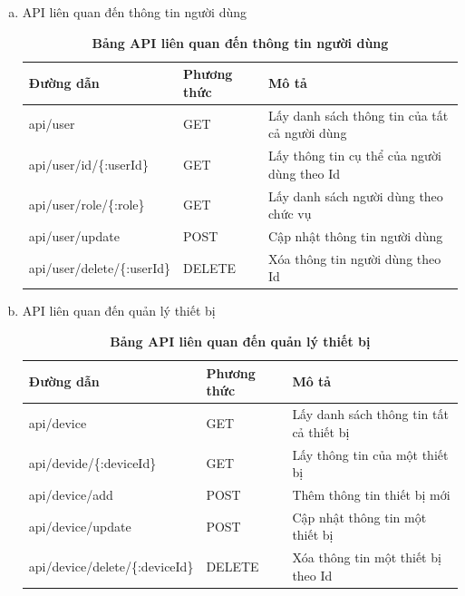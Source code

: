 \begin{enumerate}[a)]
\begin{table}[H]
\begin{tabularx}{0.9\textwidth}{
  | >{\raggedright\arraybackslash}X
  | >{\raggedright\arraybackslash}m{2cm}
  | >{\raggedright\arraybackslash}X|
  }
  \end{tabularx}
  \label{table_api_register}
\end{table}

  \item API liên quan đến thông tin người dùng
  

  \begin{table}[H]
    \centering
    \caption{\bfseries \fontsize{12pt}{0pt}\selectfont Bảng API liên quan đến thông tin người dùng}
    \begin{tabularx}{0.9\textwidth}{
    | >{\raggedright\arraybackslash}X
    | >{\raggedright\arraybackslash}m{2cm}
    | >{\raggedright\arraybackslash}X|
    }
    \hline
    \bfseries Đường dẫn    &\bfseries Phương thức    &\bfseries Mô tả\\ \hline
   api/user   &   GET  &  Lấy danh sách thông tin của tất cả người dùng \\  \hline
   api/user/id/\{:userId\}  &   GET     & Lấy thông tin cụ thể của người dùng theo Id \\ \hline
   api/user/role/\{:role\}  &   GET     & Lấy danh sách người dùng theo chức vụ \\ \hline
   api/user/update   &    POST    &  Cập nhật thông tin người dùng \\  \hline
   api/user/delete/\{:userId\}  &   DELETE     & Xóa thông tin người dùng theo Id \\ \hline

    \end{tabularx}
    \label{table_api_user}
\end{table}

\item API liên quan đến quản lý thiết bị


\begin{table}[H]
  \centering
  \caption{\bfseries \fontsize{12pt}{0pt}\selectfont Bảng API liên quan đến quản lý thiết bị}
  \begin{tabularx}{0.9\textwidth}{
  | >{\raggedright\arraybackslash}X
  | >{\raggedright\arraybackslash}m{2cm}
  | >{\raggedright\arraybackslash}X|
  }
  \hline
  \bfseries Đường dẫn    &\bfseries Phương thức    &\bfseries Mô tả\\ \hline
 api/device   &   GET  & Lấy danh sách thông tin tất cả thiết bị \\ \hline
 api/devide/\{:deviceId\}   &    GET    & Lấy thông tin của một thiết bị \\ \hline
 api/device/add &   POST     & Thêm thông tin thiết bị mới \\ \hline
 api/device/update  &     POST   & Cập nhật thông tin một thiết bị \\ \hline
 api/device/delete/\{:deviceId\}  &     DELETE   & Xóa thông tin một thiết bị theo Id \\ \hline


\end{tabularx}
\end{table}
\end{enumerate}
